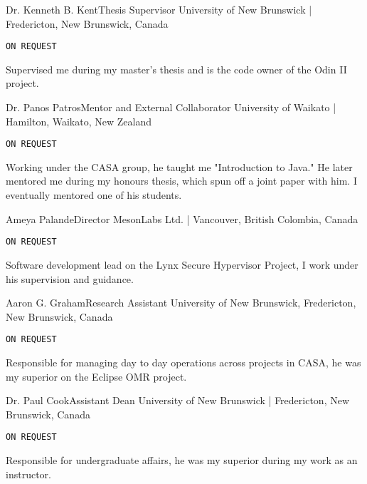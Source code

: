 
\entrys%
{Dr. Kenneth B. Kent}{Thesis Supervisor}
{University of New Brunswick | Fredericton, New Brunswick, Canada}
{\texttt{ON REQUEST}

	Supervised me during my master's thesis and is the code owner of the Odin II project.
}

\entrys%
{Dr. Panos Patros}{Mentor and External Collaborator}
{University of Waikato | Hamilton, Waikato, New Zealand}
{\texttt{ON REQUEST}

	Working under the CASA group, he taught me "Introduction to Java."
	He later mentored me during my honours thesis, which spun off a joint paper with him.
	I eventually mentored one of his students.
}



\entrys%
{Ameya Palande}{Director}
{MesonLabs Ltd. | Vancouver, British Colombia, Canada}
{\texttt{ON REQUEST} 

	Software development lead on the Lynx Secure Hypervisor Project, I work under his supervision and guidance.
}

\entrys%
{Aaron G. Graham}{Research Assistant}
{University of New Brunswick, Fredericton, New Brunswick, Canada}
{\texttt{ON REQUEST}

	Responsible for managing day to day operations across projects in CASA, he was my superior on the Eclipse OMR project.
}

\entrys%
{Dr. Paul Cook}{Assistant Dean}
{University of New Brunswick | Fredericton, New Brunswick, Canada}
{\texttt{ON REQUEST}

	Responsible for undergraduate affairs, he was my superior during my work as an instructor.
}